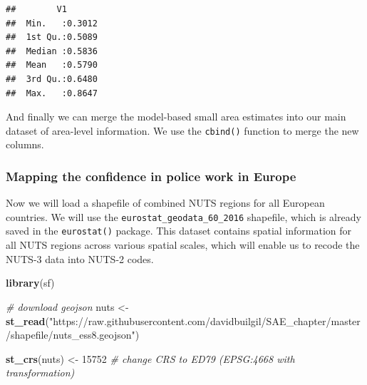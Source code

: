 \documentclass[
]{article}
\newenvironment{Shaded}{\begin{snugshade}}{\end{snugshade}}
\newcommand{\CommentTok}[1]{\textcolor[rgb]{0.56,0.35,0.01}{\textit{#1}}}
\newcommand{\DataTypeTok}[1]{\textcolor[rgb]{0.13,0.29,0.53}{#1}}
\newcommand{\DecValTok}[1]{\textcolor[rgb]{0.00,0.00,0.81}{#1}}
\newcommand{\KeywordTok}[1]{\textcolor[rgb]{0.13,0.29,0.53}{\textbf{#1}}}
\newcommand{\NormalTok}[1]{#1}
\newcommand{\OperatorTok}[1]{\textcolor[rgb]{0.81,0.36,0.00}{\textbf{#1}}}
\newcommand{\StringTok}[1]{\textcolor[rgb]{0.31,0.60,0.02}{#1}}
\begin{document}
\begin{verbatim}
##        V1        
##  Min.   :0.3012  
##  1st Qu.:0.5089  
##  Median :0.5836  
##  Mean   :0.5790  
##  3rd Qu.:0.6480  
##  Max.   :0.8647
\end{verbatim}

And finally we can merge the model-based small area estimates into our
main dataset of area-level information. We use the \texttt{cbind()}
function to merge the new columns.

\begin{Shaded}
\end{Shaded}

\hypertarget{mapping-the-confidence-in-police-work-in-europe}{%
\subsubsection{Mapping the confidence in police work in
Europe}\label{mapping-the-confidence-in-police-work-in-europe}}

Now we will load a shapefile of combined NUTS regions for all European
countries. We will use the \texttt{eurostat\_geodata\_60\_2016}
shapefile, which is already saved in the \texttt{eurostat()} package.
This dataset contains spatial information for all NUTS regions across
various spatial scales, which will enable us to recode the NUTS-3 data
into NUTS-2 codes.

\begin{Shaded}
\begin{Highlighting}[]
\KeywordTok{library}\NormalTok{(sf)}

\CommentTok{# download geojson}
\NormalTok{nuts <-}\StringTok{ }\KeywordTok{st_read}\NormalTok{(}\StringTok{"https://raw.githubusercontent.com/davidbuilgil/SAE_chapter/master/shapefile/nuts_ess8.geojson"}\NormalTok{)}

\KeywordTok{st_crs}\NormalTok{(nuts) <-}\StringTok{ }\DecValTok{15752} \CommentTok{# change CRS to ED79 (EPSG:4668 with transformation)}
\end{Highlighting}
\end{Shaded}
\end{document}
